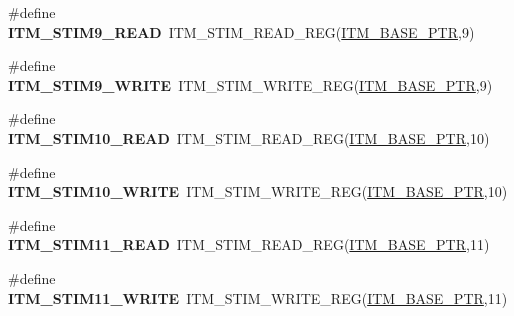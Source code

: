 \begin{DoxyCompactItemize}
\item 
\hypertarget{group___i_t_m___register___accessor___macros_ga1c080ae3f53ea5063b86fd6fe6ba264d}{}\#define {\bfseries I\+T\+M\+\_\+\+S\+T\+I\+M9\+\_\+\+R\+E\+A\+D}~I\+T\+M\+\_\+\+S\+T\+I\+M\+\_\+\+R\+E\+A\+D\+\_\+\+R\+E\+G(\hyperlink{group___i_t_m___peripheral_gafaddee8fe8b6a898d4e5edc43ee0d703}{I\+T\+M\+\_\+\+B\+A\+S\+E\+\_\+\+P\+T\+R},9)\label{group___i_t_m___register___accessor___macros_ga1c080ae3f53ea5063b86fd6fe6ba264d}

\item 
\hypertarget{group___i_t_m___register___accessor___macros_gaff1a7b2832a1e4ecef1e171dd126fc48}{}\#define {\bfseries I\+T\+M\+\_\+\+S\+T\+I\+M9\+\_\+\+W\+R\+I\+T\+E}~I\+T\+M\+\_\+\+S\+T\+I\+M\+\_\+\+W\+R\+I\+T\+E\+\_\+\+R\+E\+G(\hyperlink{group___i_t_m___peripheral_gafaddee8fe8b6a898d4e5edc43ee0d703}{I\+T\+M\+\_\+\+B\+A\+S\+E\+\_\+\+P\+T\+R},9)\label{group___i_t_m___register___accessor___macros_gaff1a7b2832a1e4ecef1e171dd126fc48}

\item 
\hypertarget{group___i_t_m___register___accessor___macros_gac52c9a2197fa51dd2395e68ce8f77f21}{}\#define {\bfseries I\+T\+M\+\_\+\+S\+T\+I\+M10\+\_\+\+R\+E\+A\+D}~I\+T\+M\+\_\+\+S\+T\+I\+M\+\_\+\+R\+E\+A\+D\+\_\+\+R\+E\+G(\hyperlink{group___i_t_m___peripheral_gafaddee8fe8b6a898d4e5edc43ee0d703}{I\+T\+M\+\_\+\+B\+A\+S\+E\+\_\+\+P\+T\+R},10)\label{group___i_t_m___register___accessor___macros_gac52c9a2197fa51dd2395e68ce8f77f21}

\item 
\hypertarget{group___i_t_m___register___accessor___macros_ga777b8d32021dcda309623609448e4042}{}\#define {\bfseries I\+T\+M\+\_\+\+S\+T\+I\+M10\+\_\+\+W\+R\+I\+T\+E}~I\+T\+M\+\_\+\+S\+T\+I\+M\+\_\+\+W\+R\+I\+T\+E\+\_\+\+R\+E\+G(\hyperlink{group___i_t_m___peripheral_gafaddee8fe8b6a898d4e5edc43ee0d703}{I\+T\+M\+\_\+\+B\+A\+S\+E\+\_\+\+P\+T\+R},10)\label{group___i_t_m___register___accessor___macros_ga777b8d32021dcda309623609448e4042}

\item 
\hypertarget{group___i_t_m___register___accessor___macros_ga0303347d6234c6044d64450073e3111d}{}\#define {\bfseries I\+T\+M\+\_\+\+S\+T\+I\+M11\+\_\+\+R\+E\+A\+D}~I\+T\+M\+\_\+\+S\+T\+I\+M\+\_\+\+R\+E\+A\+D\+\_\+\+R\+E\+G(\hyperlink{group___i_t_m___peripheral_gafaddee8fe8b6a898d4e5edc43ee0d703}{I\+T\+M\+\_\+\+B\+A\+S\+E\+\_\+\+P\+T\+R},11)\label{group___i_t_m___register___accessor___macros_ga0303347d6234c6044d64450073e3111d}

\item 
\hypertarget{group___i_t_m___register___accessor___macros_ga2b6f1a25e7ac17786baf3b401c94a1d9}{}\#define {\bfseries I\+T\+M\+\_\+\+S\+T\+I\+M11\+\_\+\+W\+R\+I\+T\+E}~I\+T\+M\+\_\+\+S\+T\+I\+M\+\_\+\+W\+R\+I\+T\+E\+\_\+\+R\+E\+G(\hyperlink{group___i_t_m___peripheral_gafaddee8fe8b6a898d4e5edc43ee0d703}{I\+T\+M\+\_\+\+B\+A\+S\+E\+\_\+\+P\+T\+R},11)\label{group___i_t_m___register___accessor___macros_ga2b6f1a25e7ac17786baf3b401c94a1d9}


\end{DoxyCompactItemize}

